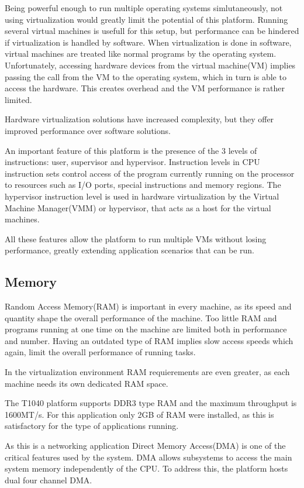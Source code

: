 Being powerful enough to run multiple operating systems simlutaneously,
not using virtualization would greatly limit the potential of this
platform. Running several virtual machines is usefull for this setup,
but performance can be hindered if virtualization is handled by software.
When virtualization is done in software, virtual machines are treated
like normal programs by the operating system. Unfortunately, 
accessing hardware devices from the virtual machine(VM) implies
passing the call from the VM to the operating system, which in turn is able
to access the hardware. This creates overhead and the VM performance is
rather limited.

Hardware virtualization solutions have increased complexity,
but they offer improved performance over software solutions.

An important feature of this platform is the presence of the 
3 levels of instructions: user, supervisor and hypervisor.
Instruction levels in CPU instruction sets control access of the program
currently running on the processor to resources such as I/O ports, special
instructions and memory regions. The hypervisor instruction level
is used in hardware virtualization by the Virtual Machine Manager(VMM)
or hypervisor, that acts as a host for the virtual machines.

All these features allow the platform to run multiple VMs without
losing performance, greatly extending application scenarios that can be run.

\subsection{Memory}
Random Access Memory(RAM) is important in every machine, as its speed and
quantity shape the overall performance of the machine. Too little RAM
and programs running at one time on the machine are limited both in
performance and number. Having an outdated type of RAM implies slow
access speeds which again, limit the overall performance of running tasks.

In the virtualization environment RAM requierements are even greater,
as each machine needs its own dedicated RAM space.

The T1040 platform supports DDR3 type RAM and the maximum throughput is
1600MT/s. For this application only 2GB of RAM were installed, as this is
satisfactory for the type of applications running.

As this is a networking application Direct Memory Access(DMA) is one
of the critical features used by the system. DMA allows subsystems 
to access the main system memory independently of the CPU.
To address this, the platform hosts dual four channel DMA.

